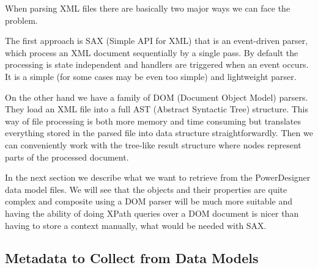 When parsing XML files there are basically two major ways we can face the problem.

The first approach is SAX (Simple API for XML) that is an event-driven parser, which process an XML document sequentially by a single pass. By default the processing is state independent and handlers are triggered when an event occurs. It is a simple (for some cases may be even too simple) and lightweight parser.

On the other hand we have a family of DOM (Document Object Model) parsers. They load an XML file into a full AST (Abstract Syntactic Tree) structure. This way of file processing is both more memory and time consuming but translates everything stored in the parsed file into data structure straightforwardly. Then we can conveniently work with the tree-like result structure where nodes represent parts of the processed document.

In the next section we describe what we want to retrieve from the PowerDesigner data model files. We will see that the objects and their properties are quite complex and composite using a DOM parser will be much more suitable and having the ability of doing XPath queries over a DOM document is nicer than having to store a context manually, what would be needed with SAX.

\subsection{Metadata to Collect from Data Models}
\label{metadata_enumeration}

